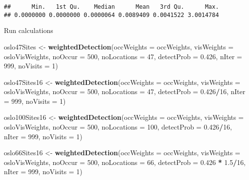 \documentclass[]{article}
\newenvironment{Shaded}{\begin{snugshade}}{\end{snugshade}}
\newcommand{\KeywordTok}[1]{\textcolor[rgb]{0.13,0.29,0.53}{\textbf{#1}}}
\newcommand{\DataTypeTok}[1]{\textcolor[rgb]{0.13,0.29,0.53}{#1}}
\newcommand{\DecValTok}[1]{\textcolor[rgb]{0.00,0.00,0.81}{#1}}
\newcommand{\FloatTok}[1]{\textcolor[rgb]{0.00,0.00,0.81}{#1}}
\newcommand{\StringTok}[1]{\textcolor[rgb]{0.31,0.60,0.02}{#1}}
\newcommand{\OperatorTok}[1]{\textcolor[rgb]{0.81,0.36,0.00}{\textbf{#1}}}
\newcommand{\NormalTok}[1]{#1}
\begin{document}
\begin{Shaded}
\end{Shaded}

\begin{verbatim}
##      Min.   1st Qu.    Median      Mean   3rd Qu.      Max. 
## 0.0000000 0.0000000 0.0000064 0.0089409 0.0041522 3.0014784
\end{verbatim}

Run calculations

\begin{Shaded}
\begin{Highlighting}[]
\NormalTok{oslo47Sites <-}\StringTok{ }\KeywordTok{weightedDetection}\NormalTok{(}\DataTypeTok{occWeights =}\NormalTok{ occWeights, }\DataTypeTok{visWeights =}\NormalTok{ osloVisWeights, }
    \DataTypeTok{noOccur =} \DecValTok{500}\NormalTok{, }\DataTypeTok{noLocations =} \DecValTok{47}\NormalTok{, }\DataTypeTok{detectProb =} \FloatTok{0.426}\NormalTok{, }\DataTypeTok{nIter =} \DecValTok{999}\NormalTok{, }\DataTypeTok{noVisits =} \DecValTok{1}\NormalTok{)}

\NormalTok{oslo47Sites16 <-}\StringTok{ }\KeywordTok{weightedDetection}\NormalTok{(}\DataTypeTok{occWeights =}\NormalTok{ occWeights, }\DataTypeTok{visWeights =}\NormalTok{ osloVisWeights, }
    \DataTypeTok{noOccur =} \DecValTok{500}\NormalTok{, }\DataTypeTok{noLocations =} \DecValTok{47}\NormalTok{, }\DataTypeTok{detectProb =} \FloatTok{0.426}\OperatorTok{/}\DecValTok{16}\NormalTok{, }\DataTypeTok{nIter =} \DecValTok{999}\NormalTok{, }\DataTypeTok{noVisits =} \DecValTok{1}\NormalTok{)}

\NormalTok{oslo100Sites16 <-}\StringTok{ }\KeywordTok{weightedDetection}\NormalTok{(}\DataTypeTok{occWeights =}\NormalTok{ occWeights, }\DataTypeTok{visWeights =}\NormalTok{ osloVisWeights, }
    \DataTypeTok{noOccur =} \DecValTok{500}\NormalTok{, }\DataTypeTok{noLocations =} \DecValTok{100}\NormalTok{, }\DataTypeTok{detectProb =} \FloatTok{0.426}\OperatorTok{/}\DecValTok{16}\NormalTok{, }\DataTypeTok{nIter =} \DecValTok{999}\NormalTok{, }\DataTypeTok{noVisits =} \DecValTok{1}\NormalTok{)}


\NormalTok{oslo66Sites16 <-}\StringTok{ }\KeywordTok{weightedDetection}\NormalTok{(}\DataTypeTok{occWeights =}\NormalTok{ occWeights, }\DataTypeTok{visWeights =}\NormalTok{ osloVisWeights, }
    \DataTypeTok{noOccur =} \DecValTok{500}\NormalTok{, }\DataTypeTok{noLocations =} \DecValTok{66}\NormalTok{, }\DataTypeTok{detectProb =} \FloatTok{0.426} \OperatorTok{*}\StringTok{ }\FloatTok{1.5}\OperatorTok{/}\DecValTok{16}\NormalTok{, }\DataTypeTok{nIter =} \DecValTok{999}\NormalTok{, }
    \DataTypeTok{noVisits =} \DecValTok{1}\NormalTok{)}


\end{Highlighting}
\end{Shaded}
\end{document}
